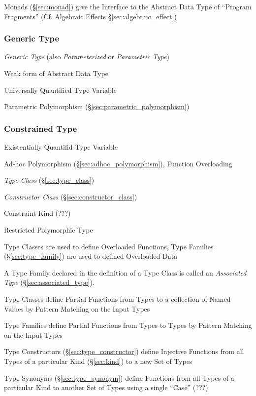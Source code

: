 Monads (\S\ref{sec:monad}) give the Interface to the Abstract Data
Type of ``Program Fragments'' (\fist Cf. Algebraic Effects
\S\ref{sec:algebraic_effect})



\subsubsection{Generic Type}\label{sec:generic_type}

\emph{Generic Type} (also \emph{Parameterized} or \emph{Parametric
  Type})

Weak form of Abstract Data Type

Universally Quantified Type Variable

Parametric Polymorphism (\S\ref{sec:parametric_polymorphism})



\subsubsection{Constrained Type}\label{sec:constrained_type}

Existentially Quantifid Type Variable

Ad-hoc Polymorphism (\S\ref{sec:adhoc_polymorphism}), Function
Overloading

\emph{Type Class} (\S\ref{sec:type_class})

\emph{Constructor Class} (\S\ref{sec:constructor_class})

Constraint Kind (???) %

Restricted Polymorphic Type %

Type Classes are used to define Overloaded Functions, Type Families
(\S\ref{sec:type_family}) are used to defined Overloaded Data

A Type Family declared in the definition of a Type Class is called an
\emph{Associated Type} (\S\ref{sec:associated_type}).

Type Classes define Partial Functions from Types to a collection of
Named Values by Pattern Matching on the Input Types

\fist Type Families define Partial Functions from Types to Types by
Pattern Matching on the Input Types

\fist Type Constructors (\S\ref{sec:type_constructor}) define
Injective Functions from all Types of a particular Kind
(\S\ref{sec:kind}) to a new Set of Types

\fist Type Synonyms (\S\ref{sec:type_synonym}) define Functions from
all Types of a particular Kind to another Set of Types using a single
``Case'' (???) %



